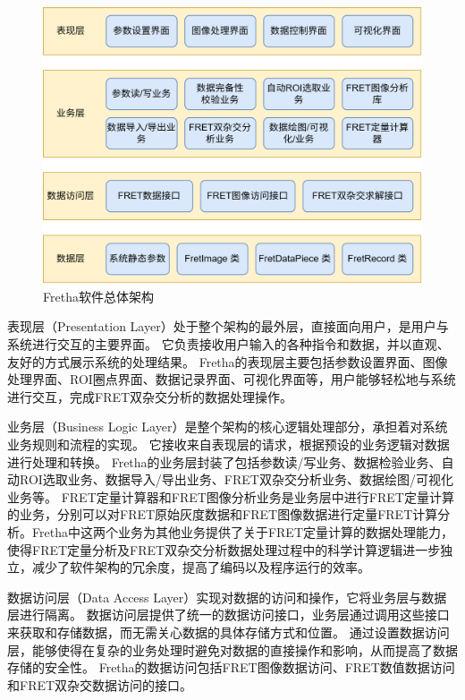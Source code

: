 \begin{figure}[hbtp]
    \centering
    \includegraphics[width=1\linewidth]{../figures/2/2_Fretha软件架构图.png}
    \caption{Fretha软件总体架构}
    \label{fig:fretha_arch}
\end{figure}

表现层（Presentation Layer）处于整个架构的最外层，直接面向用户，是用户与系统进行交互的主要界面。
它负责接收用户输入的各种指令和数据，并以直观、友好的方式展示系统的处理结果。
Fretha的表现层主要包括参数设置界面、图像处理界面、ROI圈点界面、数据记录界面、可视化界面等，用户能够轻松地与系统进行交互，完成FRET双杂交分析的数据处理操作。

业务层（Business Logic Layer）是整个架构的核心逻辑处理部分，承担着对系统业务规则和流程的实现。
它接收来自表现层的请求，根据预设的业务逻辑对数据进行处理和转换。
Fretha的业务层封装了包括参数读/写业务、数据检验业务、自动ROI选取业务、数据导入/导出业务、FRET双杂交分析业务、数据绘图/可视化业务等。
FRET定量计算器和FRET图像分析业务是业务层中进行FRET定量计算的业务，分别可以对FRET原始灰度数据和FRET图像数据进行定量FRET计算分析。Fretha中这两个业务为其他业务提供了关于FRET定量计算的数据处理能力，使得FRET定量分析及FRET双杂交分析数据处理过程中的科学计算逻辑进一步独立，减少了软件架构的冗余度，提高了编码以及程序运行的效率。

数据访问层（Data Access Layer）实现对数据的访问和操作，它将业务层与数据层进行隔离。
数据访问层提供了统一的数据访问接口，业务层通过调用这些接口来获取和存储数据，而无需关心数据的具体存储方式和位置。
通过设置数据访问层，能够使得在复杂的业务处理时避免对数据的直接操作和影响，从而提高了数据存储的安全性。
Fretha的数据访问包括FRET图像数据访问、FRET数值数据访问和FRET双杂交数据访问的接口。

